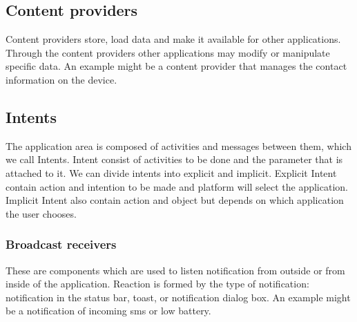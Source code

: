 \subsection{Content providers} %
Content providers store, load data and make it available for other applications. Through the content providers other applications may modify or manipulate specific data. An example might be a content provider that manages the contact information on the device.

\subsection{Intents}
The application area is composed of activities and messages between them, which we call Intents. Intent consist of activities to be done and the parameter that is attached to it. We can divide intents into explicit and implicit. Explicit Intent contain action and intention to be made and platform will select the application. Implicit Intent also contain action and object but depends on which application the user chooses.

\subsubsection{Broadcast receivers}
These are components which are used to listen notification from outside or from inside of the application. Reaction is formed by the type of notification: notification in the status bar, toast, or notification dialog box. An example might be a notification of incoming sms or low battery.

